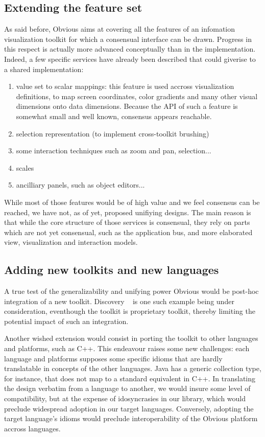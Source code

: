 \subsection{Extending the feature set}

As said before, Obvious aims at covering all the features of an infomation visualization toolkit for which a consensual interface can be drawn. Progress in this respect is actually more advanced conceptually than in the implementation. Indeed, a few specific services have already been described that could giverise to a shared implementation:

\begin{enumerate}
\item value set to scalar mappings: this feature is used accross visualization definitions, to map screen coordinates, color gradients and many other visual dimensions onto data dimensions. Because the API of such a feature is somewhat small and well known, consensus appears reachable.
\item selection representation (to implement cross-toolkit brushing)
\item some interaction techniques such as zoom and pan, selection...
\item scales
\item ancilliary panels, such as object editors...
\end{enumerate}

While most of those features would be of high value and we feel consensus can be reached, we have not, as of yet, proposed unifiying designs. The main reason is that while the core structure of those services is consensual, they rely on parts which are not yet consensual, such as the application bus, and more elaborated view, visualization and interaction models.

\subsection{Adding new toolkits and new languages}

A true test of the generalizability and unifying power Obvious would be post-hoc integration of a new toolkit. Discovery ~\cite{Discovery2} is one such example being under consideration, eventhough the toolkit is proprietary toolkit, thereby limiting the potential impact of such an integration.

Another wished extension would consist in porting the toolkit to other languages and platforms, such as C++. This endeavour raises some new challenges: each language and platforms supposes some specific idioms that are hardly translatable in concepts of the other languages. Java has a generic collection type, for instance, that does not map to a standard equivalent in C++. In translating the design verbatim from a language to another, we would insure some level of compatibility, but at the expense of idosyncrasies in our library, which would preclude widespread adoption in our target languages. Conversely, adopting the target language's idioms would preclude interoperability of the Obvious platform accross languages.

